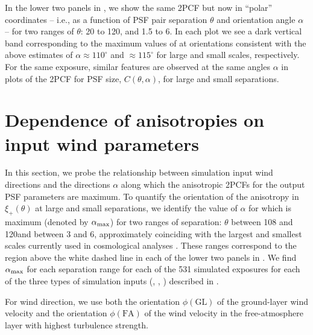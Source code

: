 \documentclass[twocolumn,twocolappendix]{openjournal}
\begin{document}
In the lower two panels in , we show the same 2PCF but now in ``polar'' coordinates -- i.e., as a function of PSF pair separation $\theta$ and orientation angle $\alpha$ --  for two ranges of $\theta$: 20 to 120\amin, and 1.5 to 6\amin. 
In each plot we see a dark vertical band corresponding to the maximum values of \xip at orientations consistent with the above estimates of $\alpha\approx 110^\circ$ and $ \approx 115^\circ$ for large and small scales, respectively. 
For the same exposure, similar features are observed at the same angles $\alpha$ in plots of the 2PCF for PSF size, $C(\theta,\alpha)$, for large and small separations. 


\section{Dependence of anisotropies on input wind parameters} \label{sec:inputcompare}

In this section, we probe the relationship between simulation input wind directions and the directions $\alpha$ along which the anisotropic 2PCFs for the output PSF parameters are maximum.
To quantify the orientation of the anisotropy in $\xi_+(\theta)$ at large and small separations, we identify the value of $\alpha$ for which \xip is maximum (denoted by $\alpha_{\rm max}$) for two ranges of separation: $\theta$ between 108 and 120\amin and between 3 and 6\amin, approximately coinciding with the largest and smallest scales currently used in cosmological analyses \citep[\eg, ][]{amon_dark_2022}. 
These ranges correspond to the region above the white dashed line in each of the lower two panels in . 
We find $\alpha_{\rm max}$ for each separation range for each of the 531 simulated exposures for each of the three types of simulation inputs (\psfwssims, \bench, \match) described in . 

For wind direction, we use both the orientation $\phi(\text{GL})$ of the ground-layer wind velocity and the orientation $\phi(\text{FA})$ of the wind velocity in the free-atmosphere layer with highest turbulence strength. 
\end{document}
